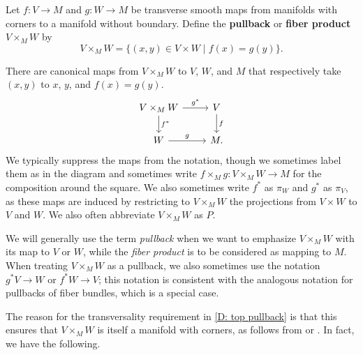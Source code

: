 \begin{definition}\label{D: top pullback}
	Let $f \colon V \to M$ and $g \colon W \to M$ be transverse smooth maps from manifolds with corners to a manifold without boundary.
	Define the \textbf{pullback} or \textbf{fiber product} $V \times_M W$ by
	$$V \times_M W = \{(x, y) \in V \times W \mid f(x) = g(y)\}.$$

	There are canonical maps from $V \times_M W$ to $V$, $W$, and $M$ that respectively take $(x,y)$ to $x$, $y$, and $f(x) = g(y)$.
	\[
	\begin{tikzcd}
		V \times_M W \arrow[r, "g^*"] \arrow[d, "f^*"] & V \arrow[d, "f"] \\
		W \arrow[r, "g"] & M.
	\end{tikzcd}
	\]
	We typically suppress the maps from the notation, though we sometimes label them as in the diagram and sometimes write $f \times_M g \colon V \times_M W \to M$ for the composition around the square.
	We also sometimes write $f^*$ as $\pi_W$ and $g^*$ as $\pi_V$, as these maps are induced by restricting to $V \times_MW$ the projections from $V \times W$ to $V$ and $W$.
	We also often abbreviate $V \times_M W$ as $P$.

	We will generally use the term \textit{pullback} when we want to emphasize $V \times_M W$ with its map to $V$ or $W$, while the \textit{fiber product} is to be considered as mapping to $M$.
	When treating $V \times_M W$ as a pullback, we also sometimes use the notation $g^*V \to W$ or $f^*W \to V$; this notation is consistent with the analogous notation for pullbacks of fiber bundles, which is a special case.
\end{definition}

The reason for the transversality requirement in \cref{D: top pullback} is that this ensures that $V \times_M W$ is itself a manifold with corners, as follows from \cite[Theorem 7.2.7]{MaDo92} or \cite[Theorem 6.4]{Joy12}. In fact, we have the following.

